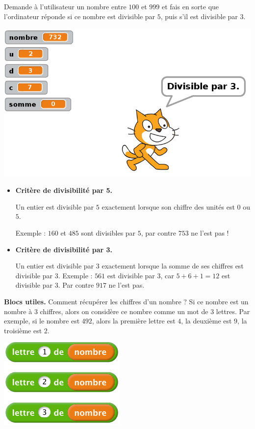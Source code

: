 \documentclass[class=report,crop=false, 12pt]{standalone}
\begin{document}
\begin{activite}

Demande à l'utilisateur un nombre entre $100$ et $999$ et fais en sorte que l'ordinateur réponde si ce nombre est divisible par $5$, puis s'il est divisible par $3$.

\begin{center}
  \includegraphics[scale=\scaleecran]{ecran-07-ex2} 
\end{center}


\begin{itemize}
  \item \textbf{Critère de divisibilité par 5.}
  
  Un entier est divisible par $5$ exactement lorsque son chiffre des unités est $0$ ou $5$.
  
  Exemple : $160$ et $485$ sont divisibles par $5$, par contre $753$ ne l'est pas !
  
  \item \textbf{Critère de divisibilité par 3.}  
  
  Un entier est divisible par $3$ exactement lorsque la somme de ses chiffres est divisible par $3$.
  Exemple : $561$ est divisible par $3$, car $5+6+1=12$ est divisible par $3$.
  Par contre $917$ ne l'est pas.  
\end{itemize}

\bigskip

\textbf{Blocs utiles.}
Comment récupérer les chiffres d'un nombre ? Si ce nombre est un 
nombre à $3$ chiffres, alors on considère ce nombre comme un mot de $3$ lettres.
Par exemple, si le nombre est $492$, alors la première lettre est $4$, la deuxième est $9$, la troisième est $2$.

\begin{center}
  \includegraphics[scale=\scalebloc]{bloc-07-ex2} 
\end{center} 




\end{activite}
\end{document}
